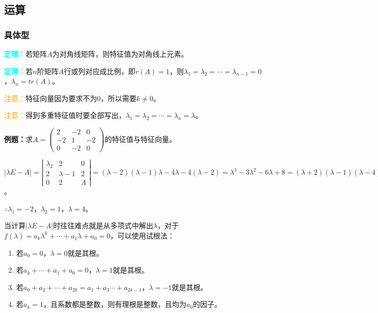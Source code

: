\documentclass[UTF8, 12pt]{ctexart}
\begin{document}
\subsection{运算}

\subsubsection{具体型}

\textcolor{aqua}{\textbf{定理：}}若矩阵$A$为对角线矩阵，则特征值为对角线上元素。

\textcolor{aqua}{\textbf{定理：}}若$n$阶矩阵$A$行或列对应成比例，即$r(A)=1$，则$\lambda_1=\lambda_2=\cdots=\lambda_{n-1}=0$，$\lambda_n=tr(A)$。

\textcolor{orange}{注意：}特征向量因为要求不为0，所以需要$k\neq0$。

\textcolor{orange}{注意：}得到多重特征值时要全部写出，$\lambda_1=\lambda_2=\cdots=\lambda_n=\lambda$。

\textbf{例题：}求$A=\left(\begin{array}{ccc}
    2 & -2 & 0 \\
    -2 & 1 & -2 \\
    0 & -2 & 0
\end{array}\right)$的特征值与特征向量。

$\vert\lambda E-A\vert=\left|\begin{array}{ccc}
    \lambda_2 & 2 & 0 \\
    2 & \lambda-1 & 2 \\
    0 & 2 & \Lambda
\end{array}\right|=(\lambda-2)(\lambda-1)\lambda-4\lambda-4(\lambda-2)=\lambda^3-3\lambda^2-6\lambda+8=(\lambda+2)(\lambda-1)(\lambda-4)=0$。

$\therefore\lambda_1=-2$，$\lambda_2=1$，$\lambda=4$。

当计算$\vert\lambda E-A\vert$时往往难点就是从多项式中解出$\lambda$，对于$f(\lambda)=a_k\lambda^k+\cdots+a_1\lambda+a_0=0$，可以使用试根法：

\begin{enumerate}
    \item 若$a_0=0$，$\lambda=0$就是其根。
    \item 若$a_k+\cdots+a_1+a_0=0$，$\lambda=1$就是其根。
    \item 若$a_0+a_2+\cdots+a_{2k}=a_1+a_3\cdots+a_{2k-1}$，$\lambda=-1$就是其根。
    \item 若$a_k=1$，且系数都是整数，则有理根是整数，且均为$a_0$的因子。
\end{enumerate}
\end{document}
